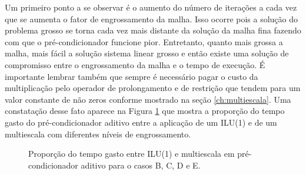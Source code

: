 Um primeiro ponto a se observar é o aumento do número de iterações a cada vez que se aumenta o fator de engrossamento da malha. Isso ocorre pois a solução do problema grosso se torna cada vez mais distante da solução da malha fina fazendo com que o pré-condicionador funcione pior. Entretanto, quanto mais grossa a malha, mais fácil a solução sistema linear grosso e então existe uma solução de compromisso entre o engrossamento da malha e o tempo de execução. É importante lembrar também que sempre é necessário pagar o custo da multiplicação pelo operador de prolongamento e de restrição que tendem para um valor constante de não zeros conforme mostrado na seção \ref{ch:multiescala}. Uma constatação desse fato aparece na Figura \ref{fig:proporcaoPrecondicionador} que mostra a proporção do tempo gasto do pré-condicionador aditivo entre a aplicação de um ILU(1) e de um multiescala com diferentes níveis de engrossamento.


\begin{figure}[h]
\center
{}
\qquad
{}
\qquad
{}
\caption{Proporção do tempo gasto entre ILU(1) e multiescala em pré-condicionador aditivo para o casos B, C, D e E.  }
\label{fig:proporcaoPrecondicionador}
\end{figure}


